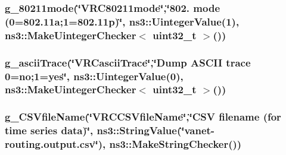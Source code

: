 \subsubsection[{\texorpdfstring{g\+\_\+80211mode}{g_80211mode}}]{ g\+\_\+80211mode(\char`\"{}V\+R\+C80211mode\char`\"{},\char`\"{}802. mode (0=802.\+11a;1=802.\+11p)\char`\"{}, ns3\+::\+Uinteger\+Value(1), ns3\+::\+Make\+Uinteger\+Checker$<$ uint32\+\_\+t $>$())\hspace{0.3cm}{\ttfamily [static]}}\hypertarget{vanet-routing-compare_8cc_ac1a83af8a2f108bc9199027f9a12bde1}{}\label{vanet-routing-compare_8cc_ac1a83af8a2f108bc9199027f9a12bde1}
\subsubsection[{\texorpdfstring{g\+\_\+ascii\+Trace}{g_asciiTrace}}]{ g\+\_\+ascii\+Trace(\char`\"{}V\+R\+Cascii\+Trace\char`\"{},\char`\"{}Dump A\+S\+C\+II trace 0=no;1=yes\char`\"{}, ns3\+::\+Uinteger\+Value(0), {\bf ns3\+::\+Make\+Uinteger\+Checker}$<$ uint32\+\_\+t $>$())\hspace{0.3cm}{\ttfamily [static]}}\hypertarget{vanet-routing-compare_8cc_a09b1c227be2534652212bf45affc48b6}{}\label{vanet-routing-compare_8cc_a09b1c227be2534652212bf45affc48b6}
\subsubsection[{\texorpdfstring{g\+\_\+\+C\+S\+Vfile\+Name}{g_CSVfileName}}]{ g\+\_\+\+C\+S\+Vfile\+Name(\char`\"{}V\+R\+C\+C\+S\+Vfile\+Name\char`\"{},\char`\"{}C\+SV filename (for time series {\bf data})\char`\"{}, ns3\+::\+String\+Value(\char`\"{}vanet-\/routing.\+output.\+csv\char`\"{}), ns3\+::\+Make\+String\+Checker())\hspace{0.3cm}{\ttfamily [static]}}\hypertarget{vanet-routing-compare_8cc_a7a349a584116d7e5f584147913d8cd42}{}\label{vanet-routing-compare_8cc_a7a349a584116d7e5f584147913d8cd42}
